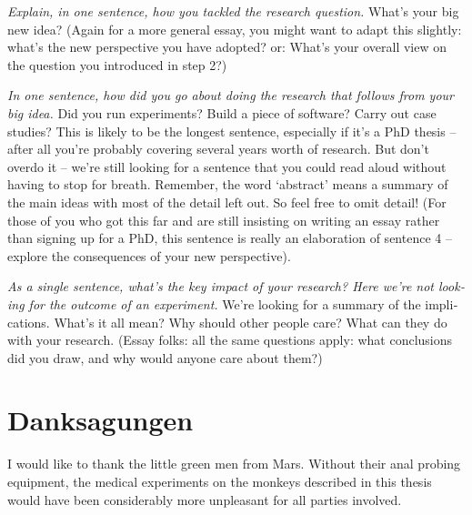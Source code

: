 \documentclass[
  fontsize=10pt
  numbers=noenddot,
  english,  %
  paper=a5,
  twoside,  %
  DIV=calc,
  headings=small,
  bibliography=totoc,
  listof=totoc,
  draft=false
]{scrbook}
\theoremstyle{break}
\begin{document}
\begin{otherlanguage}{american}
\emph{Explain, in one sentence, how you tackled the research question.} What’s your big new idea? (Again for a more general essay, you might want to adapt this slightly: what’s the new perspective you have adopted? or: What’s your overall view on the question you introduced in step 2?)

\emph{In one sentence, how did you go about doing the research that follows from your big idea.} Did you run experiments? Build a piece of software? Carry out case studies? This is likely to be the longest sentence, especially if it’s a PhD thesis – after all you’re probably covering several years worth of research. But don’t overdo it – we’re still looking for a sentence that you could read aloud without having to stop for breath. Remember, the word ‘abstract’ means a summary of the main ideas with most of the detail left out. So feel free to omit detail! (For those of you who got this far and are still insisting on writing an essay rather than signing up for a PhD, this sentence is really an elaboration of sentence 4 – explore the consequences of your new perspective).

\emph{As a single sentence, what’s the key impact of your research? Here we’re not looking for the outcome of an experiment.} We’re looking for a summary of the implications. What’s it all mean? Why should other people care? What can they do with your research. (Essay folks: all the same questions apply: what conclusions did you draw, and why would anyone care about them?)
\pagestyle{scrheadings}
\end{otherlanguage}
\clearpage

\chapter*{Danksagungen}
I would like to thank the little green men from Mars. Without their anal probing equipment, the medical experiments on the monkeys described in this thesis would have been considerably more unpleasant for all parties involved.
\clearpage



%
%
\tableofcontents
\end{document}
